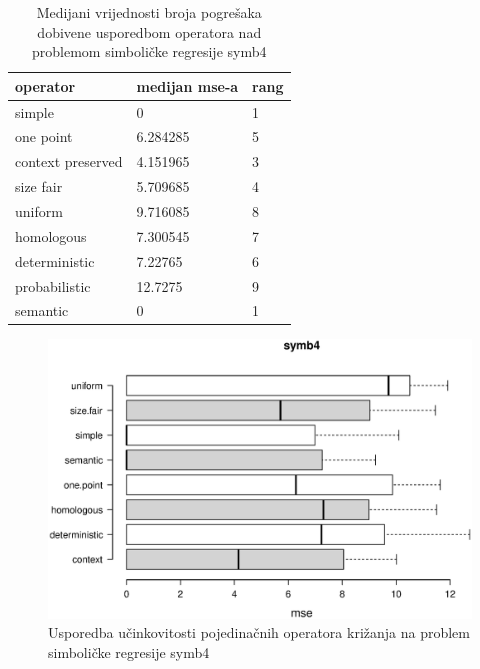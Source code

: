 \begin{table}[H]
 	\centering
\caption{Medijani vrijednosti broja pogrešaka dobivene usporedbom operatora nad problemom simboličke regresije symb4}
    \begin{tabular}{| l | l | l |}
    \hline
    \textbf{operator} & \textbf{medijan mse-a} & \textbf{rang}\\ \hline
    simple & 0 & 1\\ \hline
    one point & 6.284285 & 5\\ \hline
    context preserved & 4.151965 & 3\\ \hline
    size fair & 5.709685 & 4\\ \hline
    uniform & 9.716085 & 8\\ \hline
    homologous & 7.300545 & 7\\ \hline
    deterministic & 7.22765 & 6\\ \hline
    probabilistic & 12.7275 & 9\\ \hline
    semantic & 0 & 1\\ \hline
    \end{tabular}
    
    
    \label{symb4table}
\end{table}

\begin{figure}[H]
	\centering
	\includegraphics[trim=0cm 4cm 0cm 0cm, scale=0.6]{./slike/boxPlots/symb4.eps}
	\caption{Usporedba učinkovitosti pojedinačnih operatora križanja na problem simboličke regresije symb4}
	\label{symb4box}
\end{figure}


